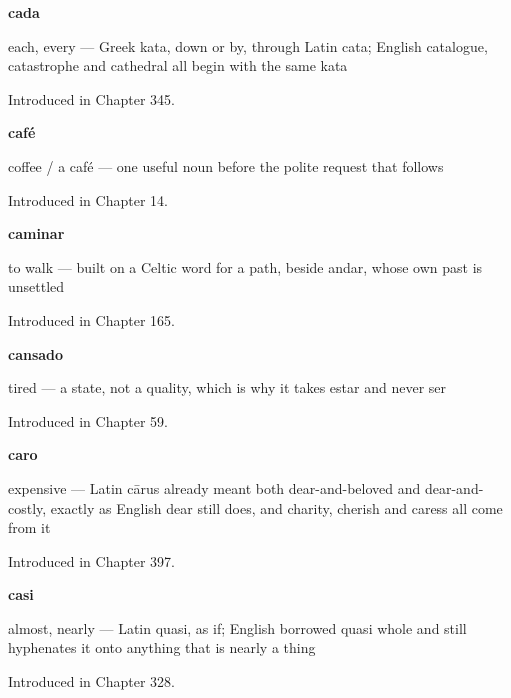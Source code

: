 \noindent\begin{minipage}[t]{\linewidth}
\raggedright
\textbf{cada}\par
\small each, every — Greek kata, down or by, through Latin cata; English catalogue, catastrophe and cathedral all begin with the same kata\par
\footnotesize Introduced in Chapter 345.
\end{minipage}\par\medskip

\noindent\begin{minipage}[t]{\linewidth}
\raggedright
\textbf{café}\par
\small coffee / a café — one useful noun before the polite request that follows\par
\footnotesize Introduced in Chapter 14.
\end{minipage}\par\medskip

\noindent\begin{minipage}[t]{\linewidth}
\raggedright
\textbf{caminar}\par
\small to walk — built on a Celtic word for a path, beside andar, whose own past is unsettled\par
\footnotesize Introduced in Chapter 165.
\end{minipage}\par\medskip

\noindent\begin{minipage}[t]{\linewidth}
\raggedright
\textbf{cansado}\par
\small tired — a state, not a quality, which is why it takes estar and never ser\par
\footnotesize Introduced in Chapter 59.
\end{minipage}\par\medskip

\noindent\begin{minipage}[t]{\linewidth}
\raggedright
\textbf{caro}\par
\small expensive — Latin cārus already meant both dear-and-beloved and dear-and-costly, exactly as English dear still does, and charity, cherish and caress all come from it\par
\footnotesize Introduced in Chapter 397.
\end{minipage}\par\medskip

\noindent\begin{minipage}[t]{\linewidth}
\raggedright
\textbf{casi}\par
\small almost, nearly — Latin quasi, as if; English borrowed quasi whole and still hyphenates it onto anything that is nearly a thing\par
\footnotesize Introduced in Chapter 328.
\end{minipage}\par\medskip

